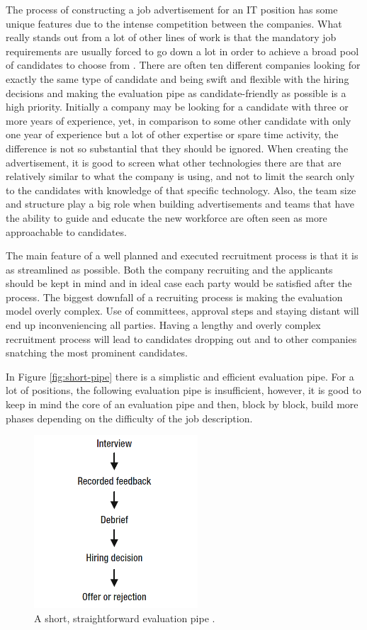 \documentclass[11pt,a4paper,oneside,article]{memoir}
\begin{document}
The process of constructing a job advertisement for an IT position has some unique features due to the intense competition between the companies. What really stands out from a lot of other lines of work is that the mandatory job requirements are usually forced to go down a lot in order to achieve a broad pool of candidates to choose from \cite[p.~48]{mcculler:book}. There are often ten different companies looking for exactly the same type of candidate and being swift and flexible with the hiring decisions and making the evaluation pipe as candidate-friendly as possible is a high priority. Initially a company may be looking for a candidate with three or more years of experience, yet, in comparison to some other candidate with only one year of experience but a lot of other expertise or spare time activity, the difference is not so substantial that they should be ignored. When creating the advertisement, it is good to screen what other technologies there are that are relatively similar to what the company is using, and not to limit the search only to the candidates with knowledge of that specific technology. Also, the team size and structure play a big role when building advertisements and teams that have the ability to guide and educate the new workforce are often seen as more approachable to candidates. \cite{noora:conversation}

The main feature of a well planned and executed recruitment process is that it is as streamlined as possible. Both the company recruiting and the applicants should be kept in mind and in ideal case each party would be satisfied after the process. The biggest downfall of a recruiting process is making the evaluation model overly complex. Use of committees, approval steps and staying distant will end up inconveniencing all parties. Having a lengthy and overly complex recruitment process will lead to candidates dropping out and to other companies snatching the most prominent candidates. \cite[p.~42]{mcculler:book}

In Figure \vref{fig:short-pipe} there is a simplistic and efficient evaluation pipe. For a lot of positions, the following evaluation pipe is insufficient, however, it is good to keep in mind the core of an evaluation pipe and then, block by block, build more phases depending on the difficulty of the job description.

\begin{figure}[h]
  \centering
  \includegraphics[width=6.1cm]{short_pipe}
  \caption{A short, straightforward evaluation pipe \cite[p.~42]{mcculler:book}.}
  \label{fig:short-pipe}
\end{figure}
\end{document}
